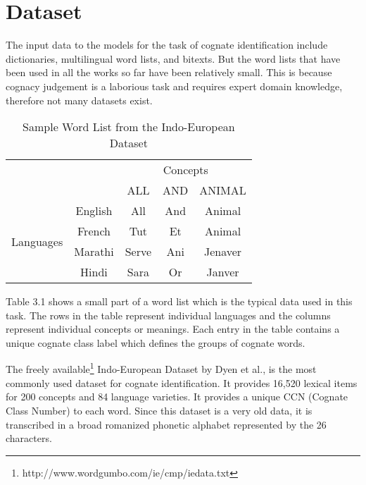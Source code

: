 \chapter{Dataset}

The input data to the models for the task of cognate identification include dictionaries, multilingual word lists, and bitexts. But the word lists that have been used in all the works so far have been relatively small. This is  because cognacy judgement is a laborious task and requires expert domain knowledge, therefore not many datasets exist.

\begin{table}[ht]
\centering
\begin{tabular}{cc|c|c|c|}
\cline{3-5}
                                                 &         & \multicolumn{3}{c|}{Concepts} \\ \cline{3-5} 
                                                 &         & ALL      & AND    & ANIMAL    \\ \hline
\multicolumn{1}{|c|}{\multirow{4}{*}{Languages}} & English & All      & And    & Animal    \\ \cline{2-5} 
\multicolumn{1}{|c|}{}                           & French  & Tut      & Et     & Animal    \\ \cline{2-5} 
\multicolumn{1}{|c|}{}                           & Marathi & Serve    & Ani    & Jenaver   \\ \cline{2-5} 
\multicolumn{1}{|c|}{}                           & Hindi   & Sara     & Or     & Janver    \\ \hline
\end{tabular}
\caption{Sample Word List from the Indo-European Dataset}
\end{table}

Table 3.1 shows a small part of a word list which is the typical data used in this task. The rows in the table represent individual languages and the columns represent individual concepts or meanings. Each entry in the table contains a unique cognate class label which defines the groups of cognate words.

The freely available\footnote{http://www.wordgumbo.com/ie/cmp/iedata.txt} Indo-European Dataset \cite{dyen1992indoeuropean} by Dyen et al., is the most commonly used dataset for cognate identification. It provides 16,520 lexical items for 200 concepts and 84 language varieties. It provides a unique CCN (Cognate Class Number) to each word. Since this dataset is a very old data, it is transcribed in a broad romanized phonetic alphabet represented by the 26 characters.

